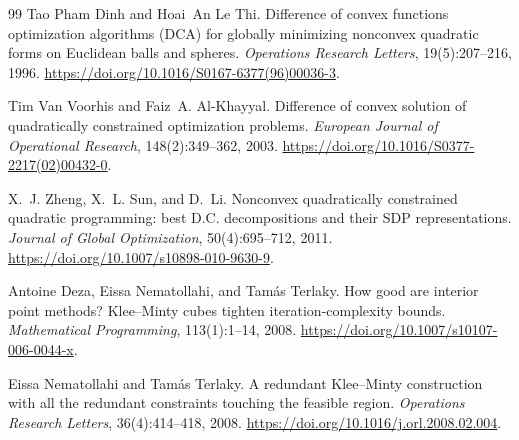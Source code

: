 \documentclass[pdflatex,sn-mathphys-num]{sn-jnl}
\theoremstyle{thmstyleone}
\theoremstyle{thmstylethree}
\newcounter{algorithm}
\begin{document}
\begin{thebibliography}{99}
Tao {Pham Dinh} and Hoai~An {Le Thi}.
\newblock Difference of convex functions optimization algorithms (DCA) for
  globally minimizing nonconvex quadratic forms on Euclidean balls and spheres.
\newblock \emph{Operations Research Letters}, 19(5):207--216, 1996.
\newblock \url{https://doi.org/10.1016/S0167-6377(96)00036-3}.

Tim {Van Voorhis} and Faiz~A. Al-Khayyal.
\newblock Difference of convex solution of quadratically constrained
  optimization problems.
\newblock \emph{European Journal of Operational Research}, 148(2):349--362, 2003.
\newblock \url{https://doi.org/10.1016/S0377-2217(02)00432-0}.

X.~J. Zheng, X.~L. Sun, and D.~Li.
\newblock Nonconvex quadratically constrained quadratic programming: best D.C.
  decompositions and their SDP representations.
\newblock \emph{Journal of Global Optimization}, 50(4):695--712, 2011.
\newblock \url{https://doi.org/10.1007/s10898-010-9630-9}.

Antoine Deza, Eissa Nematollahi, and Tam\'as Terlaky.
\newblock How good are interior point methods? Klee--Minty cubes tighten
  iteration-complexity bounds.
\newblock \emph{Mathematical Programming}, 113(1):1--14, 2008.
\newblock \url{https://doi.org/10.1007/s10107-006-0044-x}.

Eissa Nematollahi and Tam\'as Terlaky.
\newblock A redundant Klee--Minty construction with all the redundant
  constraints touching the feasible region.
\newblock \emph{Operations Research Letters}, 36(4):414--418, 2008.
\newblock \url{https://doi.org/10.1016/j.orl.2008.02.004}.

\end{thebibliography}\endgroup
\end{document}

